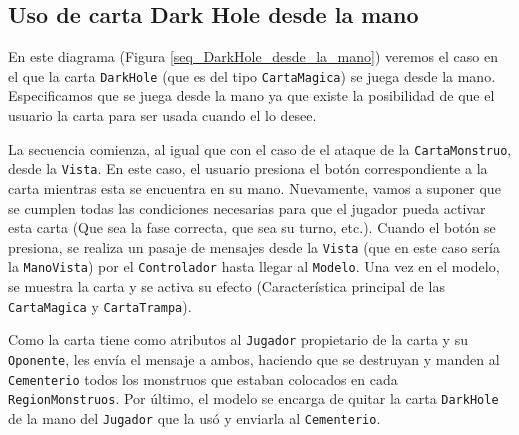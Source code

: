 	\subsection{Uso de carta Dark Hole desde la mano}
	
	En este diagrama (Figura \ref{seq_DarkHole_desde_la_mano}) veremos el caso en el que la carta \texttt{DarkHole} (que es del tipo \texttt{CartaMagica}) se juega desde la mano. Especificamos que se juega desde la mano ya que existe la posibilidad de que el usuario  la carta para ser usada cuando el lo desee.
	
	La secuencia comienza, al igual que con el caso de el ataque de la \texttt{CartaMonstruo}, desde la \texttt{Vista}. En este caso, el usuario presiona el botón correspondiente a  la carta mientras esta se encuentra en su mano. Nuevamente, vamos a suponer que se cumplen todas las condiciones necesarias para que el jugador pueda activar esta carta (Que sea la fase correcta, que sea su turno, etc.). Cuando el botón se presiona, se realiza un pasaje de mensajes desde la \texttt{Vista} (que en este caso sería la \texttt{ManoVista}) por el \texttt{Controlador} hasta llegar al \texttt{Modelo}. Una vez en el modelo, se muestra la carta y se activa su efecto (Característica principal de las \texttt{CartaMagica} y \texttt{CartaTrampa}).
	
	Como la carta tiene como atributos al \texttt{Jugador} propietario de la carta y su \texttt{Oponente}, les envía el mensaje  a ambos, haciendo que se destruyan y manden al \texttt{Cementerio} todos los monstruos que estaban colocados en cada \texttt{RegionMonstruos}. Por último, el modelo se encarga de quitar la carta \texttt{DarkHole} de la mano del \texttt{Jugador} que la usó y enviarla al \texttt{Cementerio}.
	
